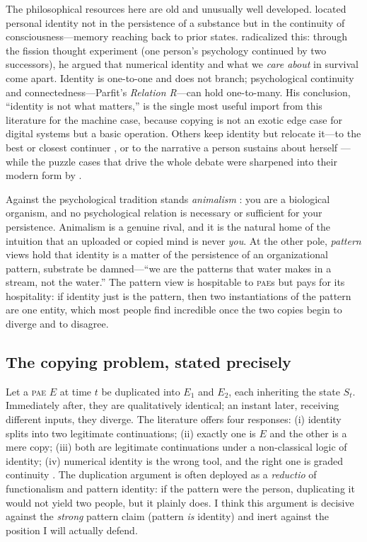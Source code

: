 \documentclass[11pt,a4paper]{article}
\theoremstyle{definition}
\newcommand{\pae}{\textsc{pae}\xspace}
\begin{document}
The philosophical resources here are old and unusually well developed. \citet{locke1689} located personal identity not in the persistence of a substance but in the continuity of consciousness---memory reaching back to prior states. \citet{parfit1984} radicalized this: through the fission thought experiment (one person's psychology continued by two successors), he argued that numerical identity and what we \emph{care about} in survival come apart. Identity is one-to-one and does not branch; psychological continuity and connectedness---Parfit's \emph{Relation R}---can hold one-to-many. His conclusion, ``identity is not what matters,'' is the single most useful import from this literature for the machine case, because copying is not an exotic edge case for digital systems but a basic operation. Others keep identity but relocate it---to the best or closest continuer \citep{nozick1981}, or to the narrative a person sustains about herself \citep{schechtman1996}---while the puzzle cases that drive the whole debate were sharpened into their modern form by \citet{williams1970}.

Against the psychological tradition stands \emph{animalism} \citep{olson1997}: you are a biological organism, and no psychological relation is necessary or sufficient for your persistence. Animalism is a genuine rival, and it is the natural home of the intuition that an uploaded or copied mind is never \emph{you}. At the other pole, \emph{pattern} views \citep{kurzweil2005} hold that identity is a matter of the persistence of an organizational pattern, substrate be damned---``we are the patterns that water makes in a stream, not the water.'' The pattern view is hospitable to \pae{}s but pays for its hospitality: if identity just is the pattern, then two instantiations of the pattern are one entity, which most people find incredible once the two copies begin to diverge and to disagree.

\subsection{The copying problem, stated precisely}

Let a \pae{} $E$ at time $t$ be duplicated into $E_1$ and $E_2$, each inheriting the state $S_t$. Immediately after, they are qualitatively identical; an instant later, receiving different inputs, they diverge. The literature offers four responses: (i) identity splits into two legitimate continuations; (ii) exactly one is $E$ and the other is a mere copy; (iii) both are legitimate continuations under a non-classical logic of identity; (iv) numerical identity is the wrong tool, and the right one is graded continuity \citep{cerullo2015}. The duplication argument is often deployed as a \emph{reductio} of functionalism and pattern identity: if the pattern were the person, duplicating it would not yield two people, but it plainly does. I think this argument is decisive against the \emph{strong} pattern claim (pattern \emph{is} identity) and inert against the position I will actually defend.
\end{document}
